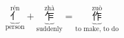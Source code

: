 \[ \underbrace{\overset{\text{rén}}{\text{亻}}}_{\text{person}} + \underbrace{\overset{\text{zhà}}{\text{乍}}}_{\text{suddenly}} = \underbrace{\overset{\text{zuò}}{\text{作}}}_{\text{to make, to do}} \]
